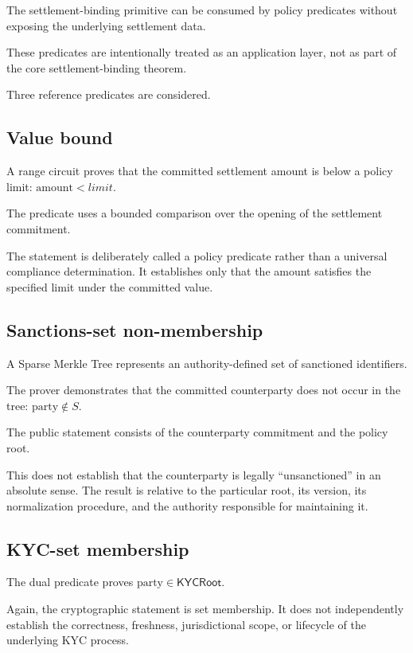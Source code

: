 \documentclass[10pt,twocolumn]{article}
\newcommand{\amount}{\ensuremath{\text{amount}}}
\newcommand{\party}{\ensuremath{\text{party}}}
\begin{document}
The settlement-binding primitive can be consumed by policy predicates
without exposing the underlying settlement data.

These predicates are intentionally treated as an application layer, not
as part of the core settlement-binding theorem.

Three reference predicates are considered.

\subsection{Value bound}

A range circuit proves that the committed settlement amount is below a
policy limit: $\amount < \mathit{limit}$.

The predicate uses a bounded comparison over the opening of the
settlement commitment.

The statement is deliberately called a policy predicate rather than a
universal compliance determination. It establishes only that the amount
satisfies the specified limit under the committed value.

\subsection{Sanctions-set non-membership}

A Sparse Merkle Tree represents an authority-defined set of sanctioned
identifiers.

The prover demonstrates that the committed counterparty does not occur
in the tree: $\party \notin S$.

The public statement consists of the counterparty commitment and the
policy root.

This does not establish that the counterparty is legally ``unsanctioned''
in an absolute sense. The result is relative to the particular root, its
version, its normalization procedure, and the authority responsible for
maintaining it.

\subsection{KYC-set membership}

The dual predicate proves $\party \in \mathsf{KYCRoot}$.

Again, the cryptographic statement is set membership. It does not
independently establish the correctness, freshness, jurisdictional
scope, or lifecycle of the underlying KYC process.
\end{document}
